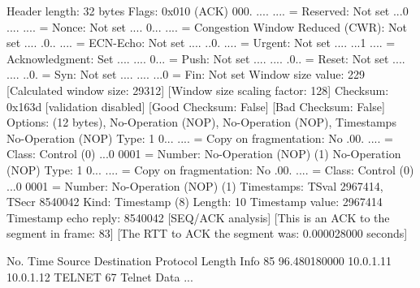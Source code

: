     Header length: 32 bytes
    Flags: 0x010 (ACK)
        000. .... .... = Reserved: Not set
        ...0 .... .... = Nonce: Not set
        .... 0... .... = Congestion Window Reduced (CWR): Not set
        .... .0.. .... = ECN-Echo: Not set
        .... ..0. .... = Urgent: Not set
        .... ...1 .... = Acknowledgment: Set
        .... .... 0... = Push: Not set
        .... .... .0.. = Reset: Not set
        .... .... ..0. = Syn: Not set
        .... .... ...0 = Fin: Not set
    Window size value: 229
    [Calculated window size: 29312]
    [Window size scaling factor: 128]
    Checksum: 0x163d [validation disabled]
        [Good Checksum: False]
        [Bad Checksum: False]
    Options: (12 bytes), No-Operation (NOP), No-Operation (NOP), Timestamps
        No-Operation (NOP)
            Type: 1
                0... .... = Copy on fragmentation: No
                .00. .... = Class: Control (0)
                ...0 0001 = Number: No-Operation (NOP) (1)
        No-Operation (NOP)
            Type: 1
                0... .... = Copy on fragmentation: No
                .00. .... = Class: Control (0)
                ...0 0001 = Number: No-Operation (NOP) (1)
        Timestamps: TSval 2967414, TSecr 8540042
            Kind: Timestamp (8)
            Length: 10
            Timestamp value: 2967414
            Timestamp echo reply: 8540042
    [SEQ/ACK analysis]
        [This is an ACK to the segment in frame: 83]
        [The RTT to ACK the segment was: 0.000028000 seconds]

No.     Time           Source                Destination           Protocol Length Info
     85 96.480180000   10.0.1.11             10.0.1.12             TELNET   67     Telnet Data ...

